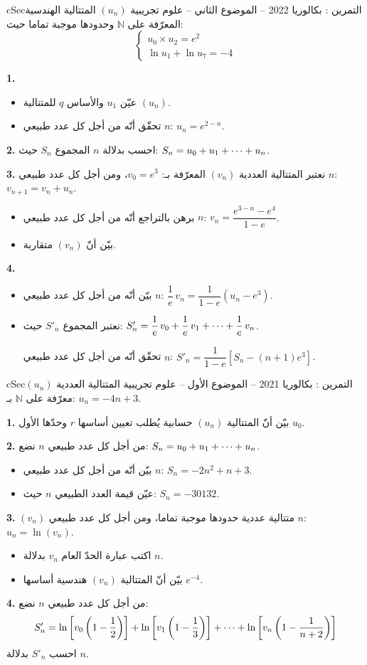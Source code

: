 \documentclass[12pt,a4paper]{article}
\newenvironment{BOX}[2]{\begin{otherlanguage}{english}\begin{arbox}{#1}{#2}}{\end{arbox}\end{otherlanguage}}
\newcounter{exo}
\newenvironment{tamrin}[1]{\stepcounter{exo}\begin{BOX}{cSec}{التمرين \theexo: #1}}{\end{BOX}}
\renewcommand{\cdots}{\mathinner{\cdotp\cdotp\cdotp}}
\newcommand{\N}{\mathbb{N}}
\newenvironment{sq}{\begin{itemize}[leftmargin=2.4em,itemsep=3pt]}{\end{itemize}}
\newcommand{\qa}{\item[(أ)]}\newcommand{\qb}{\item[(ب)]}\newcommand{\qc}{\item[(جـ)]}\newcommand{\qd}{\item[(د)]}\newcommand{\qe}{\item[(هـ)]}
\newcommand{\QQ}[1]{\par\smallskip\textbf{#1.} }
\begin{document}
\begin{tamrin}{بكالوريا 2022 -- الموضوع الثاني -- علوم تجريبية}
$(u_n)$ المتتالية الهندسية المعرّفة على $\N$ وحدودها موجبة تماما حيث:
\[\begin{cases}u_0\times u_2=e^2\\ \ln u_1+\ln u_7=-4\end{cases}\]
\QQ{1}
\begin{sq}
\qa عيّن $u_1$ والأساس $q$ للمتتالية $(u_n)$.
\qb تحقّق أنّه من أجل كل عدد طبيعي $n$: $u_n=e^{2-n}$.
\end{sq}
\QQ{2} احسب بدلالة $n$ المجموع $S_n$ حيث: $S_n=u_0+u_1+\cdots+u_n$.
\QQ{3} نعتبر المتتالية العددية $(v_n)$ المعرّفة بـ: $v_0=e^3$، ومن أجل كل عدد طبيعي $n$: $v_{n+1}=v_n+u_n$.
\begin{sq}
\qa برهن بالتراجع أنّه من أجل كل عدد طبيعي $n$: $v_n=\dfrac{e^{3-n}-e^4}{1-e}$.
\qb بيّن أنّ $(v_n)$ متقاربة.
\end{sq}
\QQ{4}
\begin{sq}
\qa بيّن أنّه من أجل كل عدد طبيعي $n$: $\dfrac1e\,v_n=\dfrac{1}{1-e}\left(u_n-e^3\right)$.
\qb نعتبر المجموع $S'_n$ حيث: $S'_n=\dfrac1e\,v_0+\dfrac1e\,v_1+\cdots+\dfrac1e\,v_n$.

تحقّق أنّه من أجل كل عدد طبيعي $n$: $S'_n=\dfrac{1}{1-e}\left[S_n-(n+1)e^3\right]$.
\end{sq}
\end{tamrin}

\begin{tamrin}{بكالوريا 2021 -- الموضوع الأول -- علوم تجريبية}
المتتالية العددية $(u_n)$ معرّفة على $\N$ بـ: $u_n=-4n+3$.

\QQ{1} بيّن أنّ المتتالية $(u_n)$ حسابية يُطلب تعيين أساسها $r$ وحدّها الأول $u_0$.
\QQ{2} من أجل كل عدد طبيعي $n$ نضع: $S_n=u_0+u_1+\cdots+u_n$.
\begin{sq}
\qa بيّن أنّه من أجل كل عدد طبيعي $n$: $S_n=-2n^2+n+3$.
\qb عيّن قيمة العدد الطبيعي $n$ حيث: $S_n=-30132$.
\end{sq}
\QQ{3} $(v_n)$ متتالية عددية حدودها موجبة تماما، ومن أجل كل عدد طبيعي $n$: $u_n=\ln(v_n)$.
\begin{sq}
\qa اكتب عبارة الحدّ العام $v_n$ بدلالة $n$.
\qb بيّن أنّ المتتالية $(v_n)$ هندسية أساسها $e^{-4}$.
\end{sq}
\QQ{4} من أجل كل عدد طبيعي $n$ نضع:
\[S'_n=\ln\left[v_0\left(1-\frac12\right)\right]+\ln\left[v_1\left(1-\frac13\right)\right]+\cdots+\ln\left[v_n\left(1-\frac{1}{n+2}\right)\right]\]
احسب $S'_n$ بدلالة $n$.
\end{tamrin}
\end{document}
